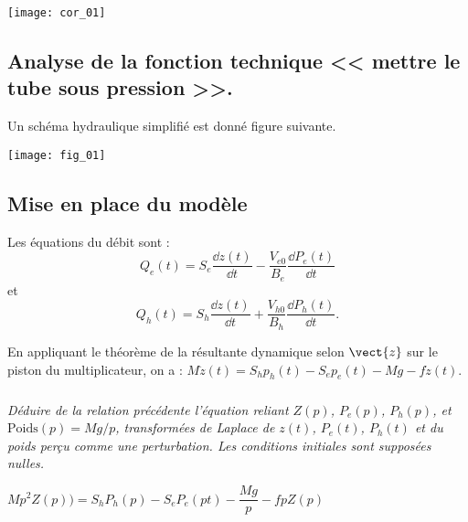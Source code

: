 \setcounter{exo}{0}
%

\ifprof
\begin{corrige}
\begin{center}
\texttt{[image: cor\_01]}
\end{center}
\end{corrige}
\else
\fi

\subsection*{Analyse de la fonction technique << mettre le tube sous pression >>.}


\ifprof
\else
Un schéma hydraulique simplifié est donné figure suivante.
\begin{center}
\texttt{[image: fig\_01]}

\end{center}
\fi

\subsection*{Mise en place du modèle}

Les équations du débit sont : 
$$Q_e(t)=S_e\dfrac{\dd z(t)}{\dd t} - \dfrac{V_{e0}}{B_e}\dfrac{\dd P_e(t)}{\dd t}$$ et 
$$Q_h(t)=S_h\dfrac{\dd z(t)}{\dd t} + \dfrac{V_{h0}}{B_h}\dfrac{\dd P_h(t)}{\dd t}.$$

En appliquant le théorème de la résultante dynamique selon $\vect{z}$ sur le piston du multiplicateur, on a : 
$
M\ddot{z}(t)=S_hp_h(t)-S_ep_e(t)-Mg-f\dot{z}(t).
$
\subparagraph{}
\textit{Déduire de la relation précédente l’équation reliant $Z(p)$, $P_e(p)$, $P_h(p)$, et $\text{Poids}(p)=Mg/p$, transformées de Laplace de $z(t)$, $P_e(t)$, $P_h(t)$ et du poids perçu comme une perturbation. Les conditions initiales sont supposées nulles.}
\ifprof
\begin{corrige}
$Mp^2 Z(p))=S_hP_h(p)-S_eP_e(pt)-\dfrac{Mg}{p}-fpZ(p)$
\end{corrige}
\else
\fi

